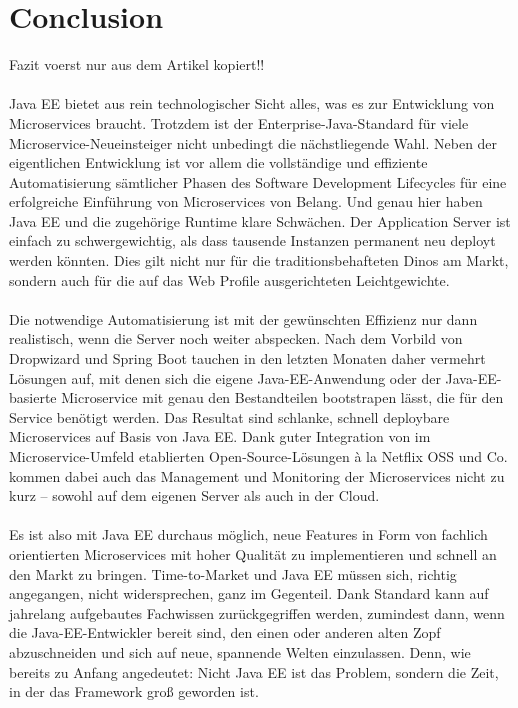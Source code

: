 \section{Conclusion}
Fazit voerst nur aus dem Artikel kopiert!!\\ \\
Java EE bietet aus rein technologischer Sicht alles, was es zur Entwicklung von Microservices braucht. Trotzdem ist der Enterprise-Java-Standard für viele Microservice-Neueinsteiger nicht unbedingt die nächstliegende Wahl. Neben der eigentlichen Entwicklung ist vor allem die vollständige und effiziente Automatisierung sämtlicher Phasen des Software Development Lifecycles für eine erfolgreiche Einführung von Microservices von Belang. Und genau hier haben Java EE und die zugehörige Runtime klare Schwächen. Der Application Server ist einfach zu schwergewichtig, als dass tausende Instanzen permanent neu deployt werden könnten. Dies gilt nicht nur für die traditionsbehafteten Dinos am Markt, sondern auch für die auf das Web Profile ausgerichteten Leichtgewichte.\\ \\
Die notwendige Automatisierung ist mit der gewünschten Effizienz nur dann realistisch, wenn die Server noch weiter abspecken. Nach dem Vorbild von Dropwizard und Spring Boot tauchen in den letzten Monaten daher vermehrt Lösungen auf, mit denen sich die eigene Java-EE-Anwendung oder der Java-EE-basierte Microservice mit genau den Bestandteilen bootstrapen lässt, die für den Service benötigt werden. Das Resultat sind schlanke, schnell deploybare Microservices auf Basis von Java EE. Dank guter Integration von im Microservice-Umfeld etablierten Open-Source-Lösungen à la Netflix OSS und Co. kommen dabei auch das Management und Monitoring der Microservices nicht zu kurz – sowohl auf dem eigenen Server als auch in der Cloud.\\ \\
Es ist also mit Java EE durchaus möglich, neue Features in Form von fachlich orientierten Microservices mit hoher Qualität zu implementieren und schnell an den Markt zu bringen. Time-to-Market und Java EE müssen sich, richtig angegangen, nicht widersprechen, ganz im Gegenteil. Dank Standard kann auf jahrelang aufgebautes Fachwissen zurückgegriffen werden, zumindest dann, wenn die Java-EE-Entwickler bereit sind, den einen oder anderen alten Zopf abzuschneiden und sich auf neue, spannende Welten einzulassen. Denn, wie bereits zu Anfang angedeutet: Nicht Java EE ist das Problem, sondern die Zeit, in der das Framework groß geworden ist.




